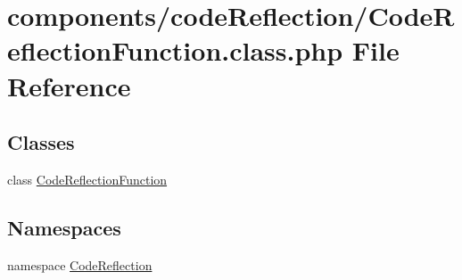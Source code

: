 \hypertarget{_code_reflection_function_8class_8php}{
\section{components/codeReflection/CodeReflectionFunction.class.php File Reference}
\label{_code_reflection_function_8class_8php}
}
\subsection*{Classes}
\begin{CompactItemize}
\item 
class \hyperlink{class_code_reflection_function}{CodeReflectionFunction}
\end{CompactItemize}
\subsection*{Namespaces}
\begin{CompactItemize}
\item 
namespace \hyperlink{namespace_code_reflection}{CodeReflection}
\end{CompactItemize}
